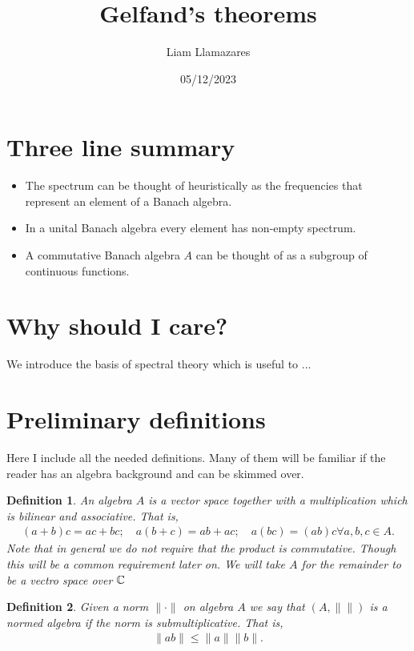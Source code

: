 \documentclass[12pt]{article}
\newtheorem{definition}{Definition}
\renewcommand{\norm}[1]{\lVert #1 \rVert}\renewcommand{\abs}[1]{\left| #1 \right|}
\begin{document}
\begin{CJK*}{UTF8}{gbsn}
	\title{Gelfand's theorems}
	\author{Liam Llamazares}
	\date{05/12/2023}
	\maketitle
	\section{ Three line summary}
	\begin{itemize}
		\item The spectrum can be thought of heuristically as the frequencies that represent an element of a Banach algebra.
		\item In a unital Banach algebra every element has non-empty spectrum.
		\item A commutative Banach algebra $A$ can be thought of as a subgroup of continuous functions.
	\end{itemize}
	\section{Why should I care?}
	We introduce the basis of spectral theory which is useful to ...
	\section{Preliminary definitions}
	Here I include all the needed definitions. Many of them will be familiar if the reader has an algebra background and can be skimmed over.
	\begin{definition}
		An \emph{algebra} $A$ is a vector space together with a multiplication which is bilinear and associative. That is,
		\begin{align*}
			(a+b)c=ac+bc;\quad a(b+c)=ab+ac; \quad a(bc)=(ab)c \forall a,b,c \in A.
		\end{align*}
		Note that in general we do not require that the product is commutative. Though this will be a common requirement later on. We will take $A$ for the remainder to be a vectro space over  $\mathbb{C}$
	\end{definition}
	\begin{definition}
		Given a norm $\norm{\cdot }$ on algebra $A$ we say that $(A, \norm{})$ is a \emph{ normed algebra} if the norm is \emph{ submultiplicative}. That is,
		\begin{align*}
			\norm{ab}\leq \norm{a}\norm{b} .
		\end{align*}


\end{definition}
\end{CJK*}
\end{document}
